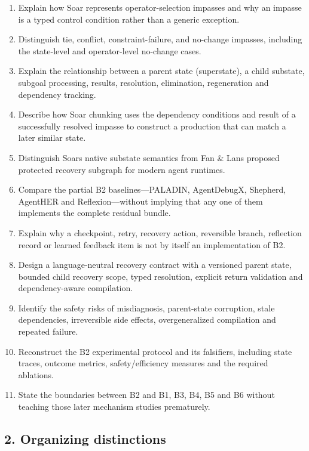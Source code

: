 \begin{enumerate}
\def\labelenumi{\arabic{enumi}.}
\tightlist
\item
  Explain how Soar represents operator-selection impasses and why an impasse is a typed control condition rather than a generic exception.
\item
  Distinguish tie, conflict, constraint-failure, and no-change impasses, including the state-level and operator-level no-change cases.
\item
  Explain the relationship between a parent state (superstate), a child substate, subgoal processing, results, resolution, elimination, regeneration and dependency tracking.
\item
  Describe how Soar chunking uses the dependency conditions and result of a successfully resolved impasse to construct a production that can match a later similar state.
\item
  Distinguish Soar\textquotesingle s native substate semantics from Fan \& Lan\textquotesingle s proposed protected recovery subgraph for modern agent runtimes.
\item
  Compare the partial B2 baselines---PALADIN, AgentDebugX, Shepherd, AgentHER and Reflexion---without implying that any one of them implements the complete residual bundle.
\item
  Explain why a checkpoint, retry, recovery action, reversible branch, reflection record or learned feedback item is not by itself an implementation of B2.
\item
  Design a language-neutral recovery contract with a versioned parent state, bounded child recovery scope, typed resolution, explicit return validation and dependency-aware compilation.
\item
  Identify the safety risks of misdiagnosis, parent-state corruption, stale dependencies, irreversible side effects, overgeneralized compilation and repeated failure.
\item
  Reconstruct the B2 experimental protocol and its falsifiers, including state traces, outcome metrics, safety/efficiency measures and the required ablations.
\item
  State the boundaries between B2 and B1, B3, B4, B5 and B6 without teaching those later mechanism studies prematurely.
\end{enumerate}

\subsection{2. Organizing distinctions}\label{2-organizing-distinctions}

